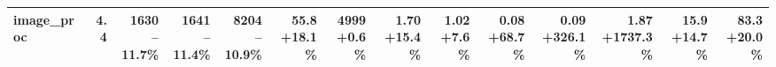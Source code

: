 \begin{table}[t]
{\begin{tabular}{lrrrrrrrrrrrrr}
\midrule
image\_proc & 4.4 & \makecell[r]{1630\\--11.7\%} & \makecell[r]{1641\\--11.4\%} & \makecell[r]{8204\\--10.9\%} & \makecell[r]{55.8\\+18.1\%} & \makecell[r]{4999\\+0.6\%} & \makecell[r]{1.70\\+15.4\%} & \makecell[r]{1.02\\+7.6\%} & \makecell[r]{0.08\\+68.7\%} & \makecell[r]{0.09\\+326.1\%} & \makecell[r]{1.87\\+1737.3\%} & \makecell[r]{15.9\\+14.7\%} & \makecell[r]{83.3\\+20.0\%} \\
\bottomrule
\end{tabular}}
\end{table}
